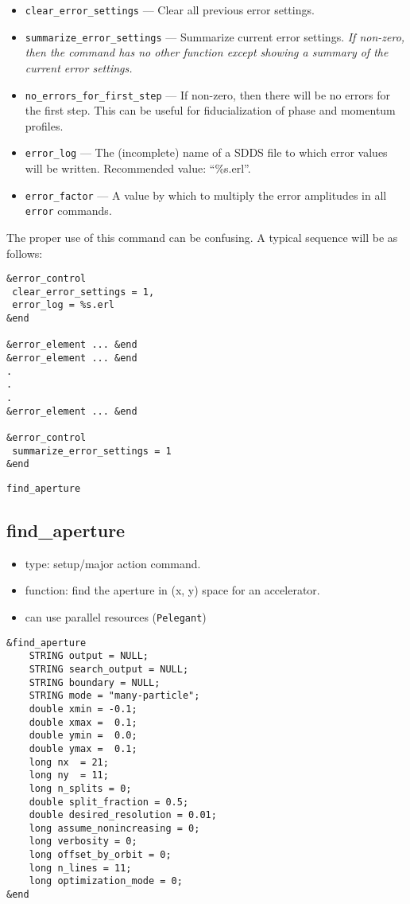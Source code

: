 \documentclass[11pt]{article}
\begin{document}
\begin{itemize}
\item \verb|clear_error_settings| --- Clear all previous error settings.
\item \verb|summarize_error_settings| --- Summarize current error settings.  {\em If non-zero, then the command has no other function  except
    showing a summary of the current error settings.}
\item \verb|no_errors_for_first_step| --- If non-zero, then there will be no errors for the first step.  This can be useful for
 fiducialization of phase and momentum profiles.
\item \verb|error_log| --- The (incomplete) name of a SDDS file to which error values will be written.  Recommended value: ``\%s.erl''.
\item \verb|error_factor| --- A value by which to multiply the error amplitudes in all \verb|error| commands.
\end{itemize}

The proper use of this command can be confusing.  A typical sequence will be as follows:
\begin{verbatim}
&error_control
 clear_error_settings = 1,
 error_log = %s.erl
&end

&error_element ... &end
&error_element ... &end
.
.
.
&error_element ... &end

&error_control
 summarize_error_settings = 1
&end
\end{verbatim}

\newpage
\begin{center}{\Large\verb|find_aperture|}\end{center}
\subsection{find\_aperture \label{subsec:findaperture}}

\begin{itemize}
\item type: setup/major action command.
\item function: find the aperture in (x, y) space for an accelerator.
\item can use parallel resources (\verb|Pelegant|)
\end{itemize}

\begin{verbatim}
&find_aperture
    STRING output = NULL;
    STRING search_output = NULL;
    STRING boundary = NULL;
    STRING mode = "many-particle";
    double xmin = -0.1;
    double xmax =  0.1;
    double ymin =  0.0;
    double ymax =  0.1;
    long nx  = 21;
    long ny  = 11;
    long n_splits = 0;
    double split_fraction = 0.5;
    double desired_resolution = 0.01;
    long assume_nonincreasing = 0;
    long verbosity = 0;    
    long offset_by_orbit = 0;
    long n_lines = 11;
    long optimization_mode = 0;
&end
\end{verbatim}
\end{document}
